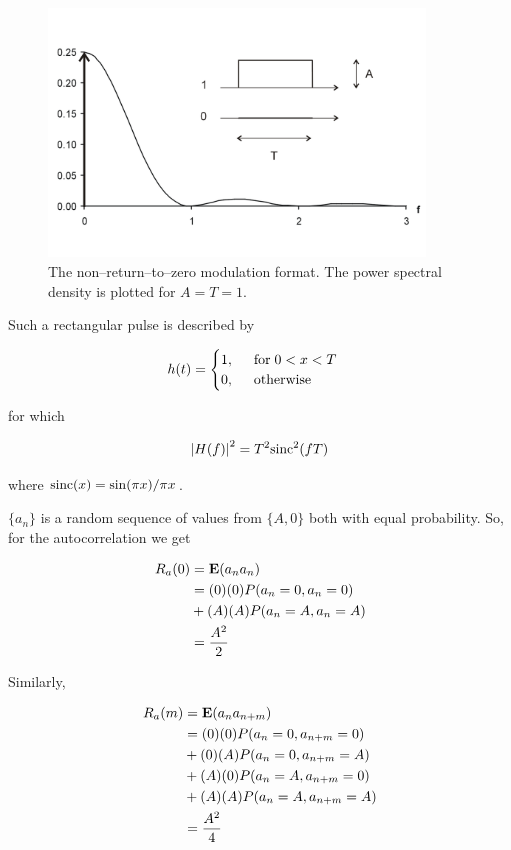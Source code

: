 \begin{figure}
\centering
\includegraphics[width=10cm]{stochastic/figures/nrz}
\caption{The non--return--to--zero modulation format. The power spectral density is plotted for $A=T=1$.}
\label{fig-nrz}
\end{figure}

Such a rectangular pulse is described by

\begin{equation}
h(t) = 
\begin{cases}
1, \hspace{0.5cm} {\rm for } \hspace{0.1cm} 0 < x < T \\ 
0, \hspace{0.5cm} {\rm otherwise}
\end{cases}
\end{equation} 

for which

\begin{equation}
\left | H(f) \right |^2 = T^2 {\rm sinc}^2 (f T)
\end{equation} 

where ${\rm sinc} (x) = \sin (\pi x) / \pi x$.

$\{ a_n \}$ is a random sequence of values from $\{A, 0\}$ both with equal probability. So, for the autocorrelation we get

\begin{align}
R_a(0) &= {\bf E}(a_n a_n) \\ \nonumber
       &= (0)(0) P(a_n=0, a_n=0) \\ \nonumber
       &+ (A)(A)P(a_n=A, a_n=A) \\ \nonumber 
       &= \frac{A^2}{2}
\end{align} 

Similarly,

\begin{align}
R_a(m) &= {\bf E}(a_n a_{n+m}) \\ \nonumber
       &=  (0)(0) P(a_n=0, a_{n+m}=0) \\ \nonumber
         & + (0)(A) P(a_n=0, a_{n+m}=A) \\ \nonumber
	 & + (A)(0)P(a_n=A, a_{n+m}=0) \\ \nonumber      
	 & + (A)(A)P(a_n=A, a_{n+m}=A) \\ \nonumber
	&= \frac{A^2}{4}
\end{align}

